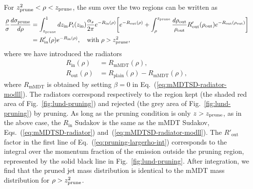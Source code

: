 For $z_{\text{prune}}^2<\rho<z_{\text{prune}}$, the sum over the two regions can be
written as
\begin{align}\label{eq:pruning-largerho-int}
  \frac{\rho}{\sigma}\frac{d\sigma_{\text{prune}}}{d\rho}
  &= \int_{z_{\text{prune}}}^1 dz_\text{in} P_i(z_\text{in})
    \frac{\alpha_s}{2\pi} e^{-R_\text{in}(\rho)}
    \bigg[
    e^{-R_\text{out}(\rho)}
    +\int_\rho^{z_{\text{prune}}}\frac{d\rho_\text{out}}{\rho_\text{out}}R'_\text{out}(\rho_\text{out})
    e^{-R_\text{out}(\rho_\text{out})}
    \bigg]\nonumber \\
  & = R'_\text{in}(\rho) e^{-R_\text{in}(\rho)}, \quad \text{with }\rho> z_{\text{prune}}^2,
\end{align}
where we have introduced the radiators
\begin{align}
  R_\text{in}(\rho) & = R_{\text{mMDT}}(\rho),\\
  R_\text{out}(\rho) & = R_{\text{plain}}(\rho)-R_{\text{mMDT}}(\rho),
\end{align}
where $R_{\text{mMDT}}$ is obtained by setting $\beta=0$ in Eq.~(\ref{eq:mMDTSD-radiator-modll}).
The radiators correspond respectively to the region kept (the shaded red area of
Fig.~\ref{fig:lund-pruning}) and rejected (the grey area of
Fig.~\ref{fig:lund-pruning}) by pruning. As long as the pruning
condition is only $z>z_{\text{prune}}$, as in the above case, the $R_\text{in}$
Sudakov is the same as the mMDT Sudakov,
Eqs.~(\ref{eq:mMDTSD-radiator}) and~(\ref{eq:mMDTSD-radiator-modll}).
%
The $R'_\text{out}$ factor in the first line of Eq.~(\ref{eq:pruning-largerho-int}) corresponds to the integral over the
momentum fraction of the emission outside the pruning region,
represented by the solid black line in Fig.~\ref{fig:lund-pruning}.
%
After integration, we find that the pruned jet mass distribution is
identical to the mMDT mass distribution for $\rho>z_{\text{prune}}^2$.

